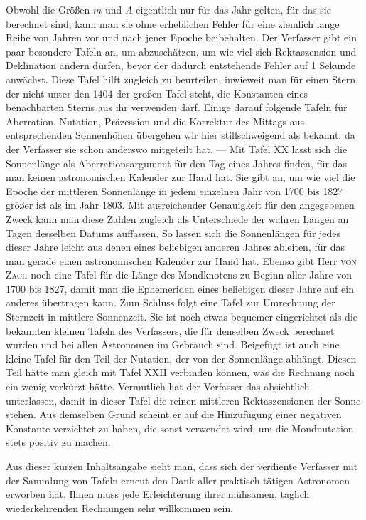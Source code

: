 Obwohl die Größen $m$ und $A$ eigentlich nur für das Jahr gelten, für das sie berechnet sind, kann man sie ohne erheblichen Fehler für eine ziemlich lange Reihe von Jahren vor und nach jener Epoche beibehalten. Der Verfasser gibt ein paar besondere Tafeln an, um abzuschätzen, um wie viel sich Rektaszension und Deklination ändern dürfen, bevor der dadurch entstehende Fehler auf 1 Sekunde anwächst. Diese Tafel hilft zugleich zu beurteilen, inwieweit man für einen Stern, der nicht unter den 1404 der großen Tafel steht, die Konstanten eines benachbarten Sterns aus ihr verwenden darf. Einige darauf folgende Tafeln für Aberration, Nutation, Präzession und die Korrektur des Mittags aus entsprechenden Sonnenhöhen übergehen wir hier stillschweigend als bekannt, da der Verfasser sie schon anderswo mitgeteilt hat. --- Mit Tafel XX lässt sich die Sonnenlänge als Aberrationsargument für den Tag eines Jahres finden, für das man keinen astronomischen Kalender zur Hand hat. Sie gibt an, um wie viel die Epoche der mittleren Sonnenlänge in jedem einzelnen Jahr von 1700 bis 1827 größer ist als im Jahr 1803. Mit ausreichender Genauigkeit für den angegebenen Zweck kann man diese Zahlen zugleich als Unterschiede der wahren Längen an Tagen desselben Datums auffassen. So lassen sich die Sonnenlängen für jedes dieser Jahre leicht aus denen eines beliebigen anderen Jahres ableiten, für das man gerade einen astronomischen Kalender zur Hand hat. Ebenso gibt Herr \textsc{von Zach} noch eine Tafel für die Länge des Mondknotens zu Beginn aller Jahre von 1700 bis 1827, damit man die Ephemeriden eines beliebigen dieser Jahre auf ein anderes übertragen kann. Zum Schluss folgt eine Tafel zur Umrechnung der Sternzeit in mittlere Sonnenzeit. Sie ist noch etwas bequemer eingerichtet als die bekannten kleinen Tafeln des Verfassers, die für denselben Zweck berechnet wurden und bei allen Astronomen im Gebrauch sind. Beigefügt ist auch eine kleine Tafel für den Teil der Nutation, der von der Sonnenlänge abhängt. Diesen Teil hätte man gleich mit Tafel XXII verbinden können, was die Rechnung noch ein wenig verkürzt hätte. Vermutlich hat der Verfasser das absichtlich unterlassen, damit in dieser Tafel die reinen mittleren Rektaszensionen der Sonne stehen. Aus demselben Grund scheint er auf die Hinzufügung einer negativen Konstante verzichtet zu haben, die sonst verwendet wird, um die Mondnutation stets positiv zu machen.

Aus dieser kurzen Inhaltsangabe sieht man, dass sich der verdiente Verfasser mit der Sammlung von Tafeln erneut den Dank aller praktisch tätigen Astronomen erworben hat. Ihnen muss jede Erleichterung ihrer mühsamen, täglich wiederkehrenden Rechnungen sehr willkommen sein.
